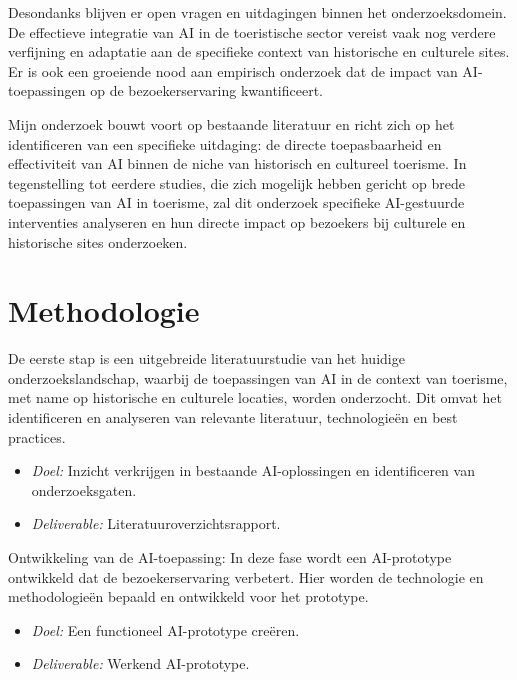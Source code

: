 Desondanks blijven er open vragen en uitdagingen binnen het onderzoeksdomein. De effectieve integratie van AI in de toeristische sector vereist vaak nog verdere verfijning en adaptatie aan de specifieke context van historische en culturele sites. Er is ook een groeiende nood aan empirisch onderzoek dat de impact van AI-toepassingen op de bezoekerservaring kwantificeert.

Mijn onderzoek bouwt voort op bestaande literatuur en richt zich op het identificeren van een specifieke uitdaging: de directe toepasbaarheid en effectiviteit van AI binnen de niche van historisch en cultureel toerisme. In tegenstelling tot eerdere studies, die zich mogelijk hebben gericht op brede toepassingen van AI in toerisme, zal dit onderzoek specifieke AI-gestuurde interventies analyseren en hun directe impact op bezoekers bij culturele en historische sites onderzoeken.



\section{Methodologie}%
\label{sec:methodologie}

De eerste stap is een uitgebreide literatuurstudie van het huidige onderzoekslandschap, waarbij de toepassingen van AI in de context van toerisme, met name op historische en culturele locaties, worden onderzocht. Dit omvat het identificeren en analyseren van relevante literatuur, technologieën en best practices.
\begin{itemize}
    \item \textit{Doel:} Inzicht verkrijgen in bestaande AI-oplossingen en identificeren van onderzoeksgaten.
    \item \textit{Deliverable:} Literatuuroverzichtsrapport.
\end{itemize}

Ontwikkeling van de AI-toepassing:
In deze fase wordt een AI-prototype ontwikkeld dat de bezoekerservaring verbetert. Hier worden de technologie en methodologieën bepaald en ontwikkeld voor het prototype.
\begin{itemize}
    \item \textit{Doel:} Een functioneel AI-prototype creëren.
    \item \textit{Deliverable:} Werkend AI-prototype.
\end{itemize}

